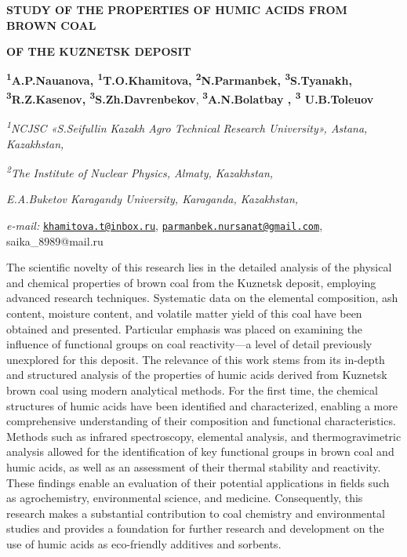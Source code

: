 {\bfseries STUDY OF THE PROPERTIES OF HUMIC ACIDS FROM BROWN COAL}

{\bfseries OF THE KUZNETSK DEPOSIT}

{\bfseries \textsuperscript{1}A.P.Nauanova,
\textsuperscript{1}T.O.Khamitova\textsuperscript{\envelope },
\textsuperscript{2}N.Parmanbek\textsuperscript{\envelope },
\textsuperscript{3}S.Tyanakh\textsuperscript{\envelope },
\textsuperscript{3}R.Z.Kasenov, \textsuperscript{3}S.Zh.Davrenbekov},
{\bfseries \textsuperscript{3}A.N.Bolatbay , \textsuperscript{3}
U.B.Toleuov}

\emph{\textsuperscript{1}NCJSC «S.Seifullin Kazakh Agro Technical
Research University», Astana, Kazakhstan,}

\emph{\textsuperscript{2}The Institute of Nuclear Physics, Almaty,
Kazakhstan,}

\emph{E.A.Buketov Karagandy University, Karaganda, Kazakhstan,}

\emph{e-mail:}
\href{mailto:khamitova.t@inbox.ru}{\nolinkurl{khamitova.t@inbox.ru}},
\href{mailto:parmanbek.nursanat@gmail.com}{\nolinkurl{parmanbek.nursanat@gmail.com}},
saika\_8989@mail.ru

The scientific novelty of this research lies in the detailed analysis of
the physical and chemical properties of brown coal from the Kuznetsk
deposit, employing advanced research techniques. Systematic data on the
elemental composition, ash content, moisture content, and volatile
matter yield of this coal have been obtained and presented. Particular
emphasis was placed on examining the influence of functional groups on
coal reactivity---a level of detail previously unexplored for this
deposit. The relevance of this work stems from its in-depth and
structured analysis of the properties of humic acids derived from
Kuznetsk brown coal using modern analytical methods. For the first time,
the chemical structures of humic acids have been identified and
characterized, enabling a more comprehensive understanding of their
composition and functional characteristics. Methods such as infrared
spectroscopy, elemental analysis, and thermogravimetric analysis allowed
for the identification of key functional groups in brown coal and humic
acids, as well as an assessment of their thermal stability and
reactivity. These findings enable an evaluation of their potential
applications in fields such as agrochemistry, environmental science, and
medicine. Consequently, this research makes a substantial contribution
to coal chemistry and environmental studies and provides a foundation
for further research and development on the use of humic acids as
eco-friendly additives and sorbents.

